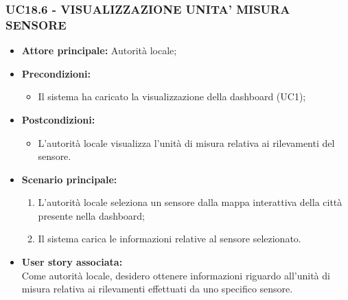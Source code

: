 \subsubsection{UC18.6 - VISUALIZZAZIONE UNITA' MISURA SENSORE}
\begin{itemize}
    \item \textbf{Attore principale:} Autorità locale;
    \item \textbf{Precondizioni:}
        \begin{itemize}
            \item Il sistema ha caricato la visualizzazione della dashboard (UC1);
        \end{itemize}
    \item \textbf{Postcondizioni:}
        \begin{itemize}
            \item L'autorità locale visualizza l'unità di misura relativa ai rilevamenti del sensore.
        \end{itemize}
    \item \textbf{Scenario principale:}
        \begin{enumerate}
            \item L'autorità locale seleziona un sensore dalla mappa interattiva della città presente nella dashboard;
            \item Il sistema carica le informazioni relative al sensore selezionato.
        \end{enumerate}
    \item \textbf{User story associata:} \\
    Come autorità locale, desidero ottenere informazioni riguardo all'unità di misura relativa ai rilevamenti effettuati da uno specifico sensore.
\end{itemize}